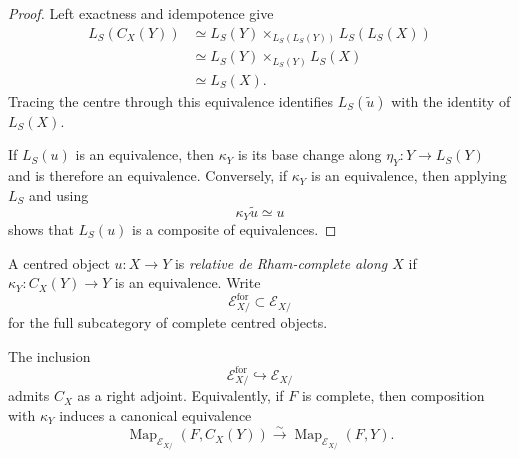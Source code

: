 \begin{proof}
Left exactness and idempotence give
\[
\begin{aligned}
    L_S(C_X(Y))
    &\simeq
    L_S(Y)
    \times_{L_S(L_S(Y))}
    L_S(L_S(X))\\
    &\simeq
    L_S(Y)
    \times_{L_S(Y)}
    L_S(X)\\
    &\simeq
    L_S(X).
\end{aligned}
\]
Tracing the centre through this equivalence identifies
$L_S(\widetilde u)$ with the identity of $L_S(X)$.

If $L_S(u)$ is an equivalence, then $\kappa_Y$ is its base change along
$\eta_Y:Y\to L_S(Y)$ and is therefore an equivalence.  Conversely, if
$\kappa_Y$ is an equivalence, then applying $L_S$ and using
\[
    \kappa_Y\widetilde u\simeq u
\]
shows that $L_S(u)$ is a composite of equivalences.
\end{proof}

\begin{definition}
\label{def:complete-centred-object}
A centred object $u:X\to Y$ is \emph{relative de Rham-complete along $X$}
if $\kappa_Y:C_X(Y)\to Y$ is an equivalence.  Write
\[
    \mathcal E^{\mathrm{for}}_{X/}
    \subset
    \mathcal E_{X/}
\]
for the full subcategory of complete centred objects.
\end{definition}

\begin{theorem}
\label{thm:centred-formalization-coreflection}
The inclusion
\[
    \mathcal E^{\mathrm{for}}_{X/}
    \hookrightarrow
    \mathcal E_{X/}
\]
admits $C_X$ as a right adjoint.  Equivalently, if $F$ is complete, then
composition with $\kappa_Y$ induces a canonical equivalence
\[
    \operatorname{Map}_{\mathcal E_{X/}}
    (F,C_X(Y))
    \xrightarrow{\sim}
    \operatorname{Map}_{\mathcal E_{X/}}
    (F,Y).
\]
\end{theorem}

